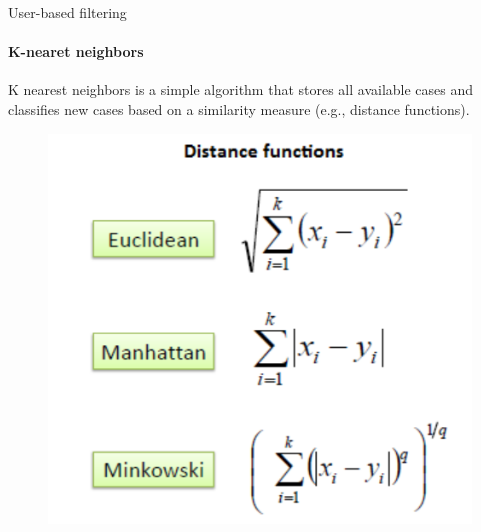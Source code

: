 \begin{frame}{User-based filtering}
\framesubtitle{K-nearet neighbors}
    \raggedright
	\begin{minipage}{0.5\linewidth}
        K nearest neighbors is a simple algorithm that stores all available cases and classifies new cases based on a similarity measure (e.g., distance functions).
	\end{minipage}
    \begin{minipage}{0.5\linewidth}
        \begin{figure}
            \includegraphics[scale=0.45]{figures/knn.PNG}
		\end{figure}
    \end{minipage}
\end{frame}



